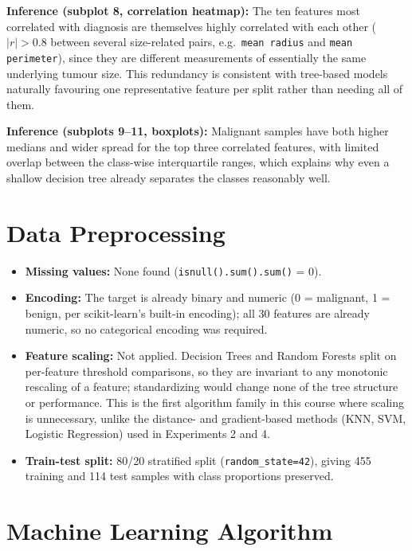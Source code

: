 \documentclass[12pt,a4paper]{article}
\begin{document}
\textbf{Inference (subplot 8, correlation heatmap):} The ten features most correlated
with diagnosis are themselves highly correlated with each other ($|r| > 0.8$ between
several size-related pairs, e.g.\ \texttt{mean radius} and \texttt{mean perimeter}),
since they are different measurements of essentially the same underlying tumour size.
This redundancy is consistent with tree-based models naturally favouring one
representative feature per split rather than needing all of them.

\textbf{Inference (subplots 9--11, boxplots):} Malignant samples have both higher
medians and wider spread for the top three correlated features, with limited overlap
between the class-wise interquartile ranges, which explains why even a shallow decision
tree already separates the classes reasonably well.

\section{Data Preprocessing}
\begin{itemize}
\item \textbf{Missing values:} None found (\texttt{isnull().sum().sum()} = 0).
\item \textbf{Encoding:} The target is already binary and numeric (0 = malignant, 1 =
benign, per scikit-learn's built-in encoding); all 30 features are already numeric, so
no categorical encoding was required.
\item \textbf{Feature scaling:} Not applied. Decision Trees and Random Forests split on
per-feature threshold comparisons, so they are invariant to any monotonic rescaling of a
feature; standardizing would change none of the tree structure or performance. This is
the first algorithm family in this course where scaling is unnecessary, unlike the
distance- and gradient-based methods (KNN, SVM, Logistic Regression) used in
Experiments 2 and 4.
\item \textbf{Train-test split:} 80/20 stratified split (\texttt{random\_state=42}),
giving 455 training and 114 test samples with class proportions preserved.
\end{itemize}

\section{Machine Learning Algorithm}
\end{document}
